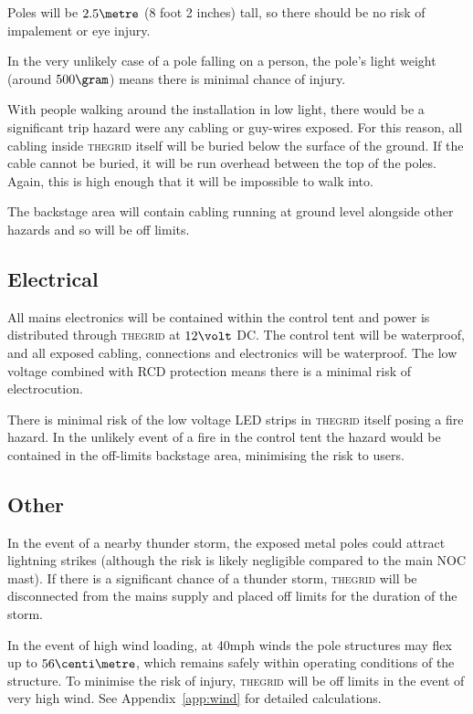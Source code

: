 \documentclass[12pt]{article} %
\newcommand{\thegrid}{\textsc{the\textperiodcentered grid}\xspace}
\begin{document}
Poles will be $2.5\metre$ (8 foot 2 inches) tall, so there should be no risk of
impalement or eye injury.

In the very unlikely case of a pole falling on a person, the pole's light
weight (around $500\gram$) means there is minimal chance of injury.

With people walking around the installation in low light, there would be a
significant trip hazard were any cabling or guy-wires exposed.  For this
reason, all cabling inside \thegrid itself will be buried below the surface of
the ground.  If the cable cannot be buried, it will be run overhead between the
top of the poles.  Again, this is high enough that it will be impossible to
walk into.

The backstage area will contain cabling running at ground level alongside other
hazards and so will be off limits.

\subsection{Electrical}
All mains electronics will be contained within the control tent and power is
distributed through \thegrid at $12\volt$ DC\@.  The control tent will be
waterproof, and all exposed cabling, connections and electronics will be
waterproof.  The low voltage combined with RCD protection means there is a
minimal risk of electrocution.

There is minimal risk of the low voltage LED strips in \thegrid itself posing a
fire hazard.  In the unlikely event of a fire in the control tent the hazard
would be contained in the off-limits backstage area, minimising the risk to
users.

\subsection{Other}
In the event of a nearby thunder storm, the exposed metal poles could attract
lightning strikes (although the risk is  likely negligible compared to the main
NOC mast).  If there is a significant chance of a thunder storm, \thegrid will
be disconnected from the mains supply and placed off limits for the duration of
the storm.

In the event of high wind loading, at 40mph winds the pole structures may flex
up to $56\centi\metre$, which remains safely within operating conditions of the
structure. To minimise the risk of injury, \thegrid will be off limits in the
event of very high wind.  See Appendix~\ref{app:wind} for detailed
calculations.
\end{document}
